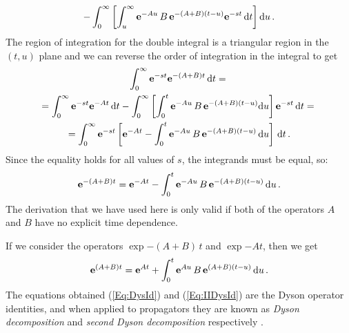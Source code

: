 \documentclass[10pt,a4paper]{book}
\theoremstyle{definition}
\begin{document}
\begin{appendices}
\begin{multline*}
  - \int_0^{\infty}\left[ \int_u^{\infty}\mathbf{e}^{-Au}\,B \,\mathbf{e}^{-(A+B)(t-u)}\mathbf{e}^{-st}\,\mbox{d} t \right] \mbox{d} u\,.
\end{multline*} 
The region of integration for the double integral is a triangular region in the $(t,u)$ plane and we can reverse the order of integration in the integral to get 
\begin{multline*}
 \int_0^{\infty} \mathbf{e}^{-st}\mathbf{e}^{-(A+B)t}\,\mbox{d} t ={}\\ 
   = \int_0^{\infty} \mathbf{e}^{-st}\mathbf{e}^{-At}\,\mbox{d} t - 
     \int_0^{\infty}\left[ \int_0^{t}\mathbf{e}^{-Au}\,B \,\mathbf{e}^{-(A+B)(t-u)}\mbox{d} u \right] \mathbf{e}^{-st}\,\mbox{d} t ={}\\
   = \int_0^{\infty} \mathbf{e}^{-st} \left[ \mathbf{e}^{-At}-\int_0^{t}\mathbf{e}^{-Au}\,B\,\mathbf{e}^{-(A+B)(t-u)}\,\mbox{d} u \right]\,\mbox{d} t\,. 
\end{multline*}
Since the equality holds for all values of $s$, the integrands must be equal, so:
\begin{equation}\label{Eq:DysId}
 \mathbf{e}^{-(A+B)t} = \mathbf{e}^{-At}-\int_0^{t}\mathbf{e}^{-Au}\,B \,\mathbf{e}^{-(A+B)(t-u)}\,\mbox{d} u\,.
\end{equation}
The derivation that we have used here is only valid if both of the operators $A$ and $B$ have no explicit time dependence. 

\noindent
If we consider the operators $\exp{-(A+B)\,t}$ and $\exp{-At}$, then we get
\begin{equation}\label{Eq:IIDysId}
 \mathbf{e}^{(A+B)t} = \mathbf{e}^{At}+\int_0^{t}\mathbf{e}^{Au}\,B \,\mathbf{e}^{(A+B)(t-u)}\,\mbox{d} u\,.
\end{equation}
The equations obtained (\ref{Eq:DysId}) and (\ref{Eq:IIDysId}) are the Dyson operator identities, and when applied to propagators they are known as \emph{Dyson decomposition} and \emph{second Dyson decomposition} respectively \cite{evans2008}. 


\end{appendices}

\backmatter

\cleardoublepage
{}
{}


\end{document}
